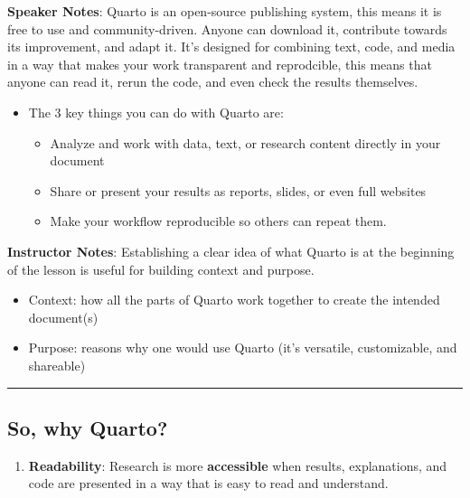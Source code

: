 \documentclass[
  letterpaper,
  DIV=11,
  numbers=noendperiod]{scrartcl}
\providecommand{\tightlist}{%
  \setlength{\itemsep}{0pt}\setlength{\parskip}{0pt}}
\begin{document}
\textbf{Speaker Notes}: Quarto is an open-source publishing system, this
means it is free to use and community-driven. Anyone can download it,
contribute towards its improvement, and adapt it. It's designed for
combining text, code, and media in a way that makes your work
transparent and reprodcible, this means that anyone can read it, rerun
the code, and even check the results themselves.

\begin{itemize}
\tightlist
\item
  The 3 key things you can do with Quarto are:

  \begin{itemize}
  \tightlist
  \item
    Analyze and work with data, text, or research content directly in
    your document
  \item
    Share or present your results as reports, slides, or even full
    websites
  \item
    Make your workflow reproducible so others can repeat them.
  \end{itemize}
\end{itemize}

\textbf{Instructor Notes}: Establishing a clear idea of what Quarto is
at the beginning of the lesson is useful for building context and
purpose.

\begin{itemize}
\item
  Context: how all the parts of Quarto work together to create the
  intended document(s)
\item
  Purpose: reasons why one would use Quarto (it's versatile,
  customizable, and shareable)
\end{itemize}

\begin{center}\rule{0.5\linewidth}{0.5pt}\end{center}

\subsection{So, why Quarto?}\label{so-why-quarto}

\begin{enumerate}
\def\labelenumi{\arabic{enumi}.}
\tightlist
\item
  \textbf{Readability}: Research is more \textbf{accessible} when
  results, explanations, and code are presented in a way that is easy to
  read and understand.
\end{enumerate}
\end{document}
